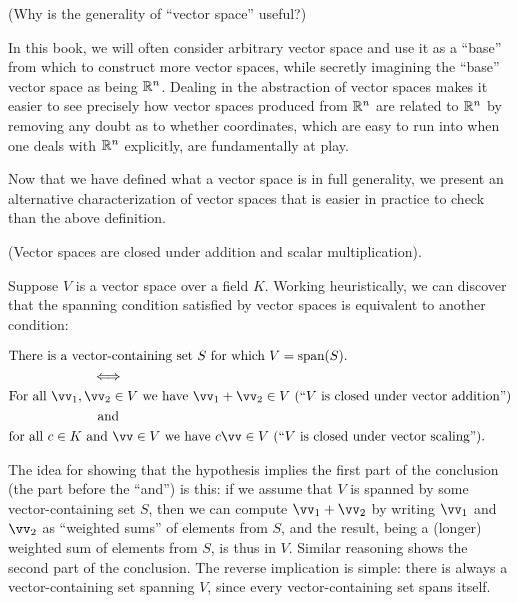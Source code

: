 \begin{remark}
    (Why is the generality of ``vector space'' useful?)
    
    In this book, we will often consider arbitrary vector space and use it as a ``base'' from which to construct more vector spaces, while secretly imagining the ``base'' vector space as being $\mathbb{R}^n$. Dealing in the abstraction of vector spaces makes it easier to see precisely how vector spaces produced from $\mathbb{R}^n$ are related to $\mathbb{R}^n$ by removing any doubt as to whether coordinates, which are easy to run into when one deals with $\mathbb{R}^n$ explicitly, are fundamentally at play.
\end{remark}

Now that we have defined what a vector space is in full generality, we present an alternative characterization of vector spaces that is easier in practice to check than the above definition. 

\begin{deriv}
    (Vector spaces are closed under addition and scalar multiplication).
    
    Suppose $V$ is a vector space over a field $K$. Working heuristically, we can discover that the spanning condition satisfied by vector spaces is equivalent to another condition:
    
    \begin{align*}
        &\text{There is a vector-containing set $S$ for which $V = \spann(S)$.} \\
        &\quad \quad \quad \quad \quad \quad \iff \\
        &\text{For all $\vv_1, \vv_2 \in V$ we have $\vv_1 + \vv_2 \in V$ (``$V$ is closed under vector addition'')} \\
        &\quad \quad \quad \quad \quad \quad \spc \spc \text{and} \\
        &\text{for all $c \in K$ and $\vv \in V$ we have $c \vv \in V$ (``$V$ is closed under vector scaling'')}.
    \end{align*}
    
    The idea for showing that the hypothesis implies the first part of the conclusion (the part before the ``and'') is this: if we assume that $V$ is spanned by some vector-containing set $S$, then we can compute $\vv_1 + \vv_2$ by writing $\vv_1$ and $\vv_2$ as ``weighted sums'' of elements from $S$, and the result, being a (longer) weighted sum of elements from $S$, is thus in $V$. Similar reasoning shows the second part of the conclusion. The reverse implication is simple: there is always a vector-containing set spanning $V$, since every vector-containing set spans itself.
\end{deriv}

